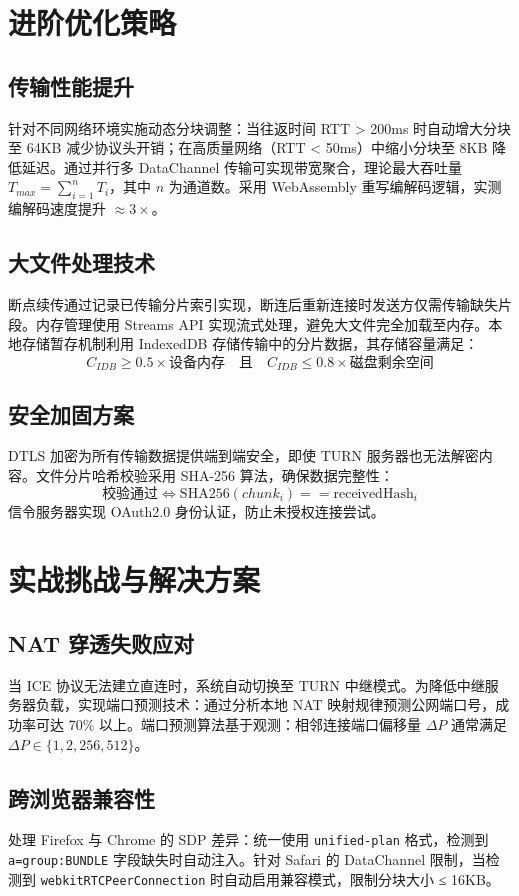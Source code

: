 \chapter{进阶优化策略}
\section{传输性能提升}
针对不同网络环境实施动态分块调整：当往返时间 RTT > 200ms 时自动增大分块至 64KB 减少协议头开销；在高质量网络（RTT < 50ms）中缩小分块至 8KB 降低延迟。通过并行多 DataChannel 传输可实现带宽聚合，理论最大吞吐量 $T_{max} = \sum_{i=1}^{n} T_i$，其中 $n$ 为通道数。采用 WebAssembly 重写编解码逻辑，实测编解码速度提升 $\approx 3\times$。\par
\section{大文件处理技术}
断点续传通过记录已传输分片索引实现，断连后重新连接时发送方仅需传输缺失片段。内存管理使用 Streams API 实现流式处理，避免大文件完全加载至内存。本地存储暂存机制利用 IndexedDB 存储传输中的分片数据，其存储容量满足：
$$ C_{IDB} \geq 0.5 \times \text{设备内存} \quad \text{且} \quad C_{IDB} \leq 0.8 \times \text{磁盘剩余空间} $$\par
\section{安全加固方案}
DTLS 加密为所有传输数据提供端到端安全，即使 TURN 服务器也无法解密内容。文件分片哈希校验采用 SHA-256 算法，确保数据完整性：
$$ \text{校验通过} \iff \text{SHA256}(chunk_i) == \text{receivedHash}_i $$
信令服务器实现 OAuth2.0 身份认证，防止未授权连接尝试。\par
\chapter{实战挑战与解决方案}
\section{NAT 穿透失败应对}
当 ICE 协议无法建立直连时，系统自动切换至 TURN 中继模式。为降低中继服务器负载，实现端口预测技术：通过分析本地 NAT 映射规律预测公网端口号，成功率可达 70\%{} 以上。端口预测算法基于观测：相邻连接端口偏移量 $\Delta P$ 通常满足 $\Delta P \in \{1,2,256,512\}$。\par
\section{跨浏览器兼容性}
处理 Firefox 与 Chrome 的 SDP 差异：统一使用 \texttt{unified-plan} 格式，检测到 \texttt{a=group:BUNDLE} 字段缺失时自动注入。针对 Safari 的 DataChannel 限制，当检测到 \texttt{webkitRTCPeerConnection} 时自动启用兼容模式，限制分块大小 ≤ 16KB。\par
